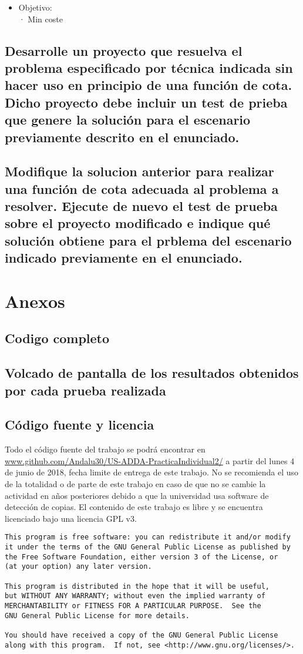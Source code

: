 \documentclass[a4paper,12pt]{article}
\begin{document}
\begin{itemize}
\item Objetivo:\\
      · Min coste


\end{itemize}


\subsection{Desarrolle un proyecto que resuelva el problema especificado por técnica indicada sin hacer uso en principio de una función de cota. Dicho proyecto debe incluir un test de prieba que genere la solución para el escenario previamente descrito en el enunciado.}
\subsection{Modifique la solucion anterior para realizar una función de cota adecuada al problema a resolver. Ejecute de nuevo el test de prueba sobre el proyecto modificado e indique qué solución obtiene para el prblema del escenario indicado previamente en el enunciado.}


\section{Anexos}
\subsection{Codigo completo}
\subsection{Volcado de pantalla de los resultados obtenidos por cada prueba realizada}
\subsection{Código fuente y licencia}
Todo el código fuente del trabajo se podrá encontrar en \url{www.github.com/Andalu30/US-ADDA-PracticaIndividual2/}
a partir del lunes 4 de junio de 2018, fecha limite de entrega de este trabajo.
No se recomienda el uso de la totalidad o de parte de este trabajo en caso de que no se cambie la actividad en años posteriores debido a que la universidad usa software de detección de copias.
El contenido de este trabajo es libre y se encuentra licenciado bajo una licencia GPL v3.\\

\begin{verbatim}
This program is free software: you can redistribute it and/or modify
it under the terms of the GNU General Public License as published by
the Free Software Foundation, either version 3 of the License, or
(at your option) any later version.

This program is distributed in the hope that it will be useful,
but WITHOUT ANY WARRANTY; without even the implied warranty of
MERCHANTABILITY or FITNESS FOR A PARTICULAR PURPOSE.  See the
GNU General Public License for more details.

You should have received a copy of the GNU General Public License
along with this program.  If not, see <http://www.gnu.org/licenses/>.

\end{verbatim}
\end{document}

